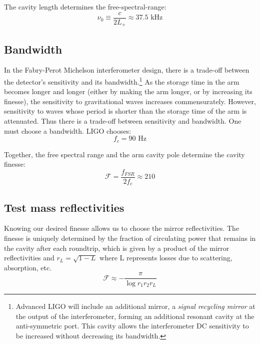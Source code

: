 The cavity length determines the free-spectral-range:
%
\begin{equation}
\nu_0\equiv\frac{c}{2L_{+}}\approx37.5\text{ kHz}
\end{equation}

\subsection*{Bandwidth}

In the Fabry-Perot Michelson interferometer design, there is a trade-off
between the detector's sensitivity and its bandwidth.\footnote{Advanced LIGO will include an additional mirror, a \emph{signal recycling mirror}\cite{Meers1988Recycling} at the output of the interferometer, forming an additional resonant cavity at the anti-symmetric port.  This cavity allows the interferometer DC sensitivity to be increased without decreasing its bandwidth.}  As the storage
time in the arm becomes longer and longer (either by making the arm
longer, or by increasing its finesse), the sensitivity to gravitational
waves increases commensurately. However, sensitivity to waves whose
period is shorter than the storage time of the arm is attenuated.
Thus there is a trade-off between sensitivity and bandwidth. 
One must choose a bandwidth. LIGO chooses:
%
\begin{equation}
f_{c}=90\text{\ Hz}
\end{equation}

Together, the free spectral range and the arm cavity pole determine
the cavity finesse:
\begin{equation}
\mathcal{F}=\frac{f_{FSR}}{2f_{c}}\approx210
\end{equation}

\subsection*{Test mass reflectivities}

Knowing our desired finesse allows us to choose the mirror reflectivities.
The finesse is uniquely determined by the fraction of circulating
power that remains in the cavity after each roundtrip, which is given
by a product of the mirror reflectivities and $r_{L}=\sqrt{1-L}$
where L represents losses due to scattering, absorption, etc. 
\begin{equation}
\mathcal{F}\approx-\frac{\pi}{\log r_{1}r_{2}r_{L}}
\end{equation}

